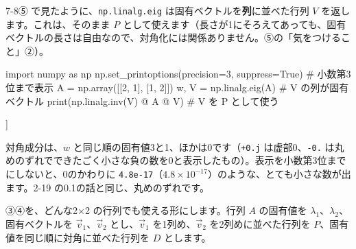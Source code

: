 7-8⑤ で見たように、\texttt{np.linalg.eig} は固有ベクトルを\textbf{列}に並べた行列 $V$ を返します。これは、そのまま $P$ として使えます（長さが1にそろえてあっても、固有ベクトルの長さは自由なので、対角化には関係ありません。⑤の「気をつけること」②）。\par{}
\begin{bkcode}[Python]
import numpy as np
np.set\_printoptions(precision=3, suppress=True)  \# 小数第3位まで表示
A = np.array([[2, 1],
              [1, 2]])
w, V = np.linalg.eig(A)            \# V の列が固有ベクトル
print(np.linalg.inv(V) @ A @ V)   \# V を P として使う
\end{bkcode}
\begin{bkcodeout}[実行結果]
[[ 3.+0.j  0.+0.j]
 [-0.+0.j  1.+0.j]]
\end{bkcodeout}
対角成分は、$w$ と同じ順の固有値3と1、ほかは0です（\texttt{+0.j} は虚部0、\texttt{-0.} は丸めのずれでできたごく小さな負の数を0と表示したもの）。表示を小数第3位までにしないと、0のかわりに \texttt{4.8e-17}（$4.8\times10^{-17}$）のような、とても小さな数が出ます。2-19 の0.1の話と同じ、丸めのずれです。




\label{bk:7-9:taikaku}③④を、どんな2×2 の行列でも使える形にします。行列 $A$ の固有値を $\lambda_1$、$\lambda_2$、固有ベクトルを $\vec v_1$、$\vec v_2$ とし、$\vec v_1$ を1列め、$\vec v_2$ を2列めに並べた行列を $P$、固有値を同じ順に対角に並べた行列を $D$ とします。

